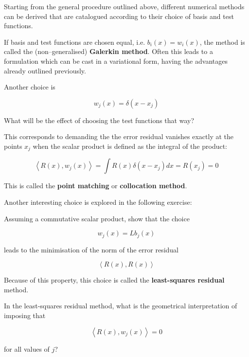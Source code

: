 Starting from the general procedure outlined above, different numerical methods can be derived that are catalogued according to their choice of basis and test functions.

If basis and test functions are chosen equal, i.e. $b_i(x) = w_i(x)$, the method is called the (non--generalised) \textbf{Galerkin method}. Often this leads to a formulation which can be cast in a variational form, having the advantages already outlined previously.

Another choice is

\begin{equation}
w_j(x) = \delta(x-x_j)
\end{equation} 

\begin{cue}
What will be the effect of choosing the test functions that way?  
\end{cue}

This corresponds to demanding the the error residual vanishes exactly at the points $x_j$ when the scalar product is defined as the integral of the product:

\begin{equation}
\left\langle R(x), w_j(x) \right\rangle = \int R(x) \delta(x-x_j) dx = R(x_j) = 0
\end{equation} 

This is called the \textbf{point matching} or \textbf{collocation method}.

Another interesting choice is explored in the following exercise:

\begin{exer}
Assuming a commutative scalar product, show that the choice 

$$w_j(x) = L b_j(x)$$

leads to the minimisation of the norm of the error residual 

$$\left\langle R(x), R(x) \right\rangle$$ 

Because of this property, this choice is called the \textbf{least-squares residual} method.
\end{exer}

\pagebreak

\begin{exer}
In the least-squares residual method, what is the geometrical interpretation of imposing that 

$$\left\langle R(x), w_j(x) \right\rangle = 0$$ 

for all values of $j$?
\end{exer}


